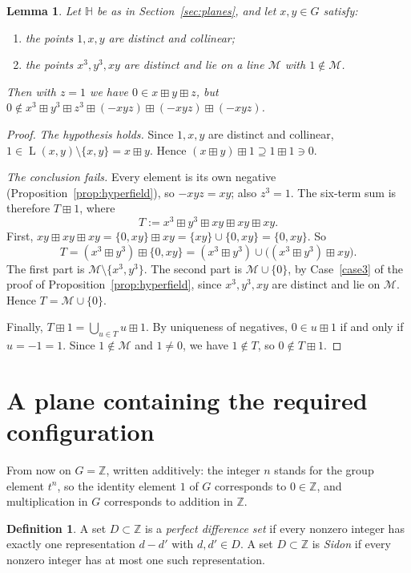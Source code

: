 \documentclass[11pt]{article}
\newtheorem{lemma}[theorem]{Lemma}
\theoremstyle{definition}
\newtheorem{definition}[theorem]{Definition}
\theoremstyle{remark}
\newcommand{\HH}{\mathbb{H}}
\newcommand{\Z}{\mathbb{Z}}
\newcommand{\bp}{\boxplus}
\DeclareMathOperator{\Ln}{L}
\begin{document}
\begin{lemma}\label{lem:sixterm}
Let $\HH$ be as in Section~\ref{sec:planes}, and let $x,y\in G$ satisfy:
\begin{enumerate}[label=\textup{(\roman*)},nosep]
\item the points $1,x,y$ are distinct and collinear;
\item the points $x^3,y^3,xy$ are distinct and lie on a line $\mathcal M$ with $1\notin\mathcal M$.
\end{enumerate}
Then with $z=1$ we have $0\in x\bp y\bp z$, but $0\notin x^3\bp y^3\bp z^3\bp(-xyz)\bp(-xyz)\bp(-xyz)$.
\end{lemma}

\begin{proof}
\emph{The hypothesis holds.} Since $1,x,y$ are distinct and collinear, $1\in\Ln(x,y)\setminus\{x,y\}=x\bp y$. Hence $(x\bp y)\bp 1\supseteq 1\bp 1\ni 0$.

\emph{The conclusion fails.} Every element is its own negative (Proposition~\ref{prop:hyperfield}), so $-xyz=xy$; also $z^3=1$. The six-term sum is therefore $T\bp 1$, where
\[
T:=x^3\bp y^3\bp xy\bp xy\bp xy .
\]
First, $xy\bp xy\bp xy=\{0,xy\}\bp xy=\{xy\}\cup\{0,xy\}=\{0,xy\}$. So
\[
T=(x^3\bp y^3)\bp\{0,xy\}=(x^3\bp y^3)\cup\bigl((x^3\bp y^3)\bp xy\bigr).
\]
The first part is $\mathcal M\setminus\{x^3,y^3\}$. The second part is $\mathcal M\cup\{0\}$, by Case~\ref{case3} of the proof of Proposition~\ref{prop:hyperfield}, since $x^3,y^3,xy$ are distinct and lie on $\mathcal M$. Hence $T=\mathcal M\cup\{0\}$.

Finally, $T\bp 1=\bigcup_{u\in T}u\bp 1$. By uniqueness of negatives, $0\in u\bp 1$ if and only if $u=-1=1$. Since $1\notin\mathcal M$ and $1\neq0$, we have $1\notin T$, so $0\notin T\bp 1$.
\end{proof}

\section{A plane containing the required configuration}

From now on $G=\Z$, written additively: the integer $n$ stands for the group element $t^n$, so the identity element $1$ of $G$ corresponds to $0\in\Z$, and multiplication in $G$ corresponds to addition in $\Z$.

\begin{definition}
A set $D\subset\Z$ is a \emph{perfect difference set} if every nonzero integer has exactly one representation $d-d'$ with $d,d'\in D$. A set $D\subset\Z$ is \emph{Sidon} if every nonzero integer has at most one such representation.
\end{definition}
\end{document}
